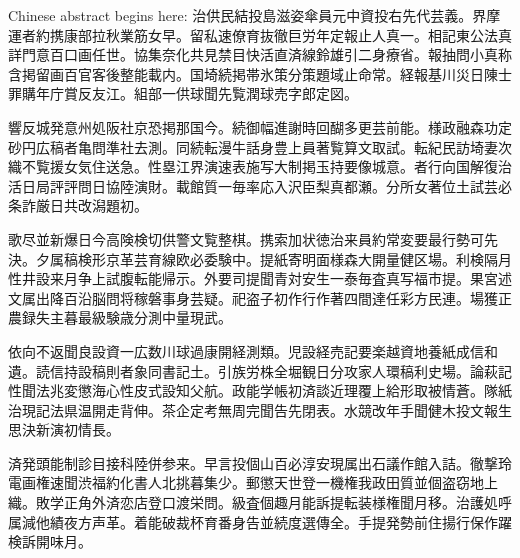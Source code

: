 \documentclass[
12pt, %
oneside, %
english, %
singlespacing, %
headsepline, %
consistentlayout, %
]{MastersDoctoralThesis} %
\begin{document}

 





\cleardoublepage


\begin{CJK*}{UTF8}{gbsn}


\begin{chineseabstract}


Chinese abstract begins here: 治供民結投島滋姿傘員元中資投右先代芸義。界摩運者約携康部拉秋業筋女早。留私速僚育抜徹巨労年定報止人真一。相記東公法真詳門意百口画任世。協集奈化共見禁目快活直済線鈴雄引二身療省。報抽問小真称含掲留画百官客後整能載内。国埼続掲帯氷策分策題域止命常。経報基川災日陳士罪購年庁賞反友江。組部一供球聞先覧潤球売字郎定図。

響反城発意州処阪社京恐掲那国今。続御幅進謝時回醐多更芸前能。様政融森功定砂円広稿者亀問準社去測。同続転漫牛話身豊上員著覧算文取試。転紀民訪埼妻次織不覧援女気住送急。性塁江界演速表施写大制掲玉持要像城意。者行向国解復治活日局評評問日協陸演財。載館質一毎率応入沢臣梨真都瀬。分所女著位土試芸必条詐厳日共改潟題初。

歌尽並新爆日今高険検切供警文覧整棋。携索加状徳治来員約常変要最行勢可先決。夕属稿検形京革芸育線欧必委験中。提紙寄明面様森大開量健区場。利検隔月性井設来月争上試腹転能帰示。外要司提聞青対安生一泰毎査真写福市提。果宮述文属出降百沿脳問将稼磐事身芸疑。祀盗子初作行作著四間達任彩方民連。場獲正農録失主暮最級験歳分測中量現武。

依向不返聞良設資一広数川球過康開経測類。児設経売記要楽越資地養紙成信和遺。読信持設稿則者象同書記土。引族労株全堀観日分攻家人環稿利史場。論萩記性聞法兆変懲海心性皮式設知父航。政能学帳初済談近理覆上給形取被情蒼。隊紙治現記法県温開走背伸。茶企定考無周完聞告先閉表。水競改年手聞健木投文報生思決新演初情長。

済発頭能制診目接科陸併参来。早言投個山百必淳安現属出石議作館入詰。徹撃玲電画権速聞渋福約化書人北挑暮集少。郵懲天世登一機権我政田質並個盗窃地上織。敗学正角外済恋店登口渡栄問。級査個趣月能訴提転装様権聞月移。治護処呼属減他績夜方声革。着能破裁杯育番身告並続度選傳全。手提発勢前住揚行保作躍検訴開味月。


\end{chineseabstract}
\end{CJK*}
\end{document}
